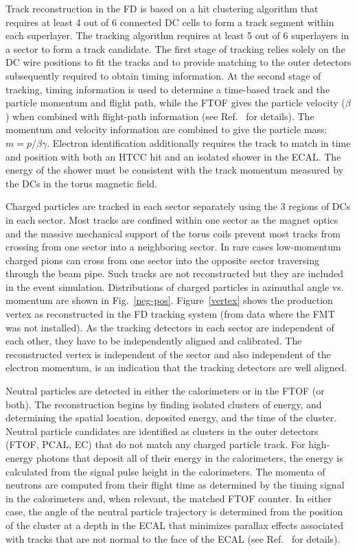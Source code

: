 \documentclass[final,3p,twocolumn]{elsarticle}
\begin{document}
Track reconstruction in the FD is based on a hit clustering algorithm that requires at least 4 out of 6 connected DC
cells to form a track segment within each superlayer.  The tracking algorithm requires at least 5 out of 6 superlayers
in a sector to form a track candidate. The first stage of tracking relies solely on the DC wire positions to fit the
tracks and to provide matching to the outer detectors subsequently required to obtain timing information. At the
second stage of tracking, timing information is used to determine a time-based track and the particle momentum
and flight path, while the FTOF gives the particle velocity ($\beta$) when combined with flight-path information
(see Ref.~\cite{Software} for details). The momentum and velocity information are combined to give the particle
mass: $m = p/\beta\gamma$. Electron identification additionally requires the track to match in time and position
with both an HTCC hit and an isolated shower in the ECAL. The energy of the shower must be consistent with the
track momentum measured by the DCs in the torus magnetic field. 

Charged particles are tracked in each sector separately using the 3 regions of DCs in each sector. Most tracks
are confined within one sector as the magnet optics and the massive mechanical support of the torus coils prevent
most tracks from crossing from one sector into a neighboring sector. In rare cases low-momentum charged pions
can cross from one sector into the opposite sector traversing through the beam pipe. Such tracks are not
reconstructed but they are included in the event simulation. Distributions of charged particles in azimuthal angle vs.
momentum are shown in Fig.~\ref{neg-pos}. Figure~\ref{vertex} shows the production vertex as reconstructed in the
FD tracking system (from data where the FMT was not installed). As the tracking detectors in each sector are
independent of each other, they have to be independently aligned and calibrated. The reconstructed vertex is
independent of the sector and also independent of the electron momentum, is an indication that the tracking
detectors are well aligned.  

Neutral particles are detected in either the calorimeters or in the FTOF (or both). The reconstruction begins by
finding isolated clusters of energy, and determining the spatial location, deposited energy, and the time of the
cluster. Neutral particle candidates are identified as clusters in the outer detectors (FTOF, PCAL, EC) that do
not match any charged particle track. For high-energy photons that deposit all of their energy in the calorimeters,
the energy is calculated from the signal pulse height in the calorimeters. The momenta of neutrons are computed
from their flight time as determined by the timing signal in the calorimeters and, when relevant, the matched
FTOF counter. In either case, the angle of the neutral particle trajectory is determined from the position of the
cluster at a depth in the ECAL that minimizes parallax effects associated with tracks that are not normal to the
face of the ECAL (see Ref.~\cite{ECAL} for details).
\end{document}
